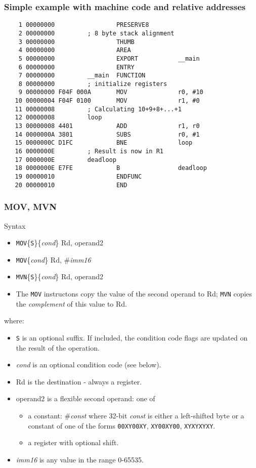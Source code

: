 \documentclass[10pt]{beamer}
\begin{document}
\begin{frame} [fragile]
\frametitle{Simple example with machine code and relative addresses}
\small {
\begin{verbatim}
    1 00000000                 PRESERVE8      
    2 00000000         ; 8 byte stack alignment
    3 00000000                 THUMB           
    4 00000000                 AREA            
    5 00000000                 EXPORT           __main
    6 00000000                 ENTRY
    7 00000000         __main  FUNCTION
    8 00000000         ; initialize registers
    9 00000000 F04F 000A       MOV              r0, #10
   10 00000004 F04F 0100       MOV              r1, #0 
   11 00000008         ; Calculating 10+9+8+...+1
   12 00000008         loop
   13 00000008 4401            ADD              r1, r0 
   14 0000000A 3801            SUBS             r0, #1 
   15 0000000C D1FC            BNE              loop 
   16 0000000E         ; Result is now in R1
   17 0000000E         deadloop
   18 0000000E E7FE            B                deadloop 
   19 00000010                 ENDFUNC
   20 00000010                 END         
\end{verbatim}
}
\end{frame}

\begin{frame}
\frametitle{MOV, MVN}
Syntax
\begin{itemize}
\item \texttt{MOV}\{\texttt{S}\}\{\textit{cond}\} Rd, operand2
\item \texttt{MOV}\{\textit{cond}\} Rd, \#\textit{imm16}
\item \texttt{MVN}\{\texttt{S}\}\{\textit{cond}\} Rd, operand2
\item The \texttt{MOV} instructons copy the value of the second operand to Rd; \texttt{MVN} copies the \emph{complement} of this value to Rd.
\end{itemize}

where:
\begin{itemize}
\item \texttt{S} is an optional suffix. If included, the condition code flags are updated on the
 result of the operation.
\item \textit{cond} is an optional condition code (see below).
\item Rd is the destination - always a register.
\item operand2 is a flexible second operand: one of
  \begin{itemize}
  \item a constant: \#\textit{const} where 32-bit \textit{const} is either a left-shifted byte or a constant of one of the forms \texttt{00XY00XY}, \texttt{XY00XY00}, \texttt{XYXYXYXY}.
  \item a register with optional shift.
  \end{itemize}
\item \textit{imm16} is any value in the range 0-65535.
\end{itemize}
\end{frame}
\end{document}
